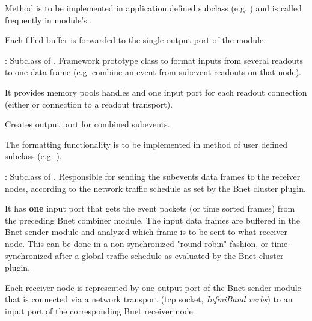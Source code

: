 \begin{description}
\begin{compactenum}
  \item Method  is to be implemented in application 
      defined subclass (e.g. ) and is called frequently 
      in module's . 
  \item Each filled buffer is forwarded to the single output port of the module. 
\end{compactenum}
\item[\class{bnet::CombinerModule}] :  
   Subclass of . 
   Framework prototype class to format inputs from several readouts to one data 
   frame (e.g. combine an event from subevent readouts on that node). 
\begin{compactenum}
  \item It provides memory pools handles and one input port for each 
      readout connection \\
      (either  or connection to a 
      readout transport). 
  \item Creates output port for combined subevents.    
  \item The formatting functionality is to be implemented in method 
       of user defined subclass (e.g. ).
\end{compactenum}
\item[\class{bnet::SenderModule}] : 
Subclass of . 
   Responsible for sending the subevents data frames to the receiver 
   nodes, according to the network traffic schedule as set by the Bnet cluster plugin.
\begin{compactenum}
  \item It has {\bf one} input port that gets the event packets 
      (or time sorted frames) from the preceding Bnet combiner module. 
      The input data frames are buffered in the Bnet sender module and analyzed 
      which frame is to be sent to what receiver node. 
      This can be done in a non-synchronized "round-robin" fashion, 
      or time-synchronized after a global traffic schedule as evaluated by 
      the Bnet cluster plugin.  
  \item Each receiver node is represented by one output port of 
      the Bnet sender module that is connected via a network transport 
      (tcp socket, {\em InfiniBand verbs}) to an input port of the 
      corresponding Bnet receiver node.

\end{compactenum}
\end{description}
